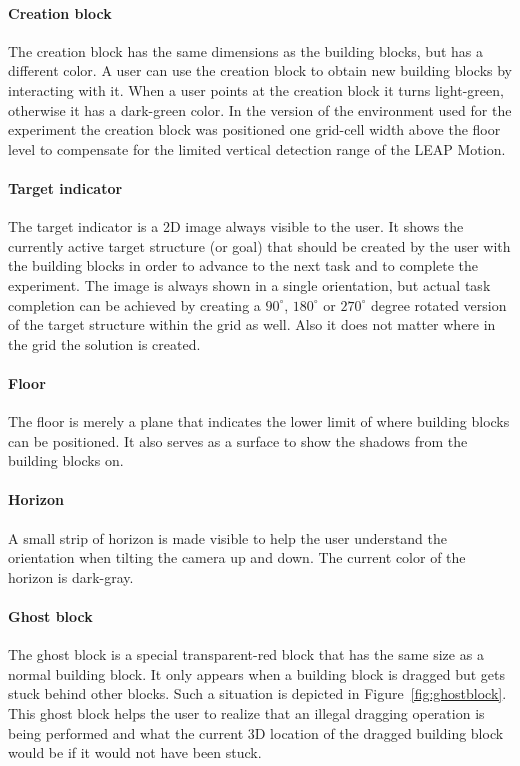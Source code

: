 \paragraph{Creation block}
The creation block has the same dimensions as the building blocks, but has a different color. A user can use the creation block to obtain new building blocks by interacting with it. When a user points at the creation block it turns light-green, otherwise it has a dark-green color. In the version of the environment used for the experiment the creation block was positioned one grid-cell width above the floor level to compensate for the limited vertical detection range of the LEAP Motion.

\paragraph{Target indicator}
The target indicator is a 2D image always visible to the user. It shows the currently active target structure (or goal) that should be created by the user with the building blocks in order to advance to the next task and to complete the experiment. The image is always shown in a single orientation, but actual task completion can be achieved by creating a $90^{\circ}$, $180^{\circ}$ or $270^{\circ}$ degree rotated version of the target structure within the grid as well. Also it does not matter where in the grid the solution is created.

\paragraph{Floor}
The floor is merely a plane that indicates the lower limit of where building blocks can be positioned. It also serves as a surface to show the shadows from the building blocks on.

\paragraph{Horizon}
A small strip of horizon is made visible to help the user understand the orientation when tilting the camera up and down. The current color of the horizon is dark-gray.


\paragraph{Ghost block}
The ghost block is a special transparent-red block that has the same size as a normal building block. It only appears when a building block is dragged but gets stuck behind other blocks. Such a situation is depicted in Figure~\ref{fig:ghostblock}. This ghost block helps the user to realize that an illegal dragging operation is being performed and what the current 3D location of the dragged building block would be if it would not have been stuck.

